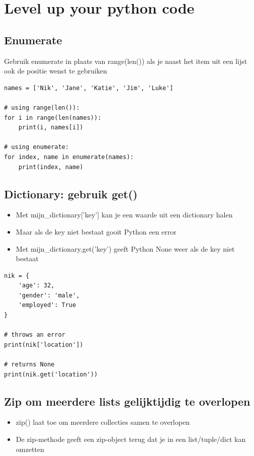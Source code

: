 \documentclass{article}
\begin{document}
\section{Level up your python code}

\subsection{Enumerate}

Gebruik enumerate in plaats van range(len()) als je naast het item uit een lijst 
ook de positie wenst te gebruiken

\begin{verbatim}
names = ['Nik', 'Jane', 'Katie', 'Jim', 'Luke']

# using range(len()):
for i in range(len(names)):
    print(i, names[i])

# using enumerate:
for index, name in enumerate(names):
    print(index, name)
\end{verbatim}

\subsection{Dictionary: gebruik get()}

\begin{itemize}
    \item Met mijn\_dictionary['key'] kan je een waarde uit een dictionary halen
    \item Maar als de key niet bestaat gooit Python een error
    \item Met mijn\_dictionary.get('key') geeft Python None weer als de key niet bestaat
\end{itemize}

\begin{verbatim}
nik = {
    'age': 32,
    'gender': 'male',
    'employed': True
}

# throws an error
print(nik['location'])

# returns None
print(nik.get('location'))
\end{verbatim}

\subsection{Zip om meerdere lists gelijktijdig te overlopen}

\begin{itemize}
    \item zip() laat toe om meerdere collecties samen te overlopen
    \item De zip-methode geeft een zip-object terug dat je in een list/tuple/dict kan omzetten
\end{itemize}
\end{document}
